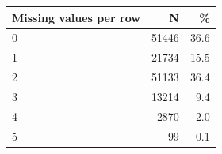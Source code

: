 \begin{threeparttable}


\begin{tabular}{@{}lrr@{}}


\toprule


\textbf{Missing values per row} & \textbf{N} & \textbf{\%} \\


\midrule


\midrule
0           &       51446&        36.6\\
1           &       21734&        15.5\\
2           &       51133&        36.4\\
3           &       13214&         9.4\\
4           &        2870&         2.0\\
5           &          99&         0.1\\
\bottomrule


\end{tabular}


\end{threeparttable}
